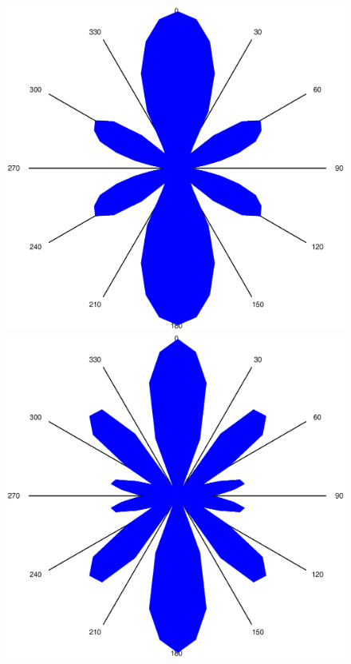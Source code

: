 \begin{figure}
\begin{minipage}{0.45\textwidth}
\includegraphics[scale=0.2]{FP-V23data/2.3_4985.394Hz.eps}
\includegraphics[scale=0.2]{FP-V23data/2.3_6230.866Hz.eps}
\end{minipage}

\end{figure}
